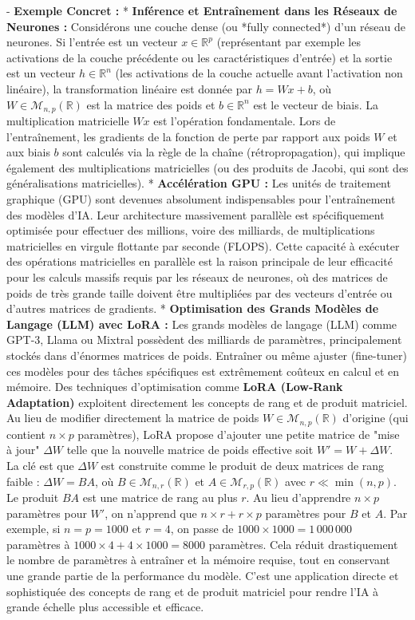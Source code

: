 \documentclass[12pt,a4paper]{report}
\begin{document}
-   \textbf{Exemple Concret :}
    *   \textbf{Inférence et Entraînement dans les Réseaux de Neurones :} Considérons une couche dense (ou *fully connected*) d'un réseau de neurones. Si l'entrée est un vecteur $x \in \mathbb{R}^p$ (représentant par exemple les activations de la couche précédente ou les caractéristiques d'entrée) et la sortie est un vecteur $h \in \mathbb{R}^n$ (les activations de la couche actuelle avant l'activation non linéaire), la transformation linéaire est donnée par $h = Wx + b$, où $W \in \mathcal{M}_{n,p}(\mathbb{R})$ est la matrice des poids et $b \in \mathbb{R}^n$ est le vecteur de biais. La multiplication matricielle $Wx$ est l'opération fondamentale. Lors de l'entraînement, les gradients de la fonction de perte par rapport aux poids $W$ et aux biais $b$ sont calculés via la règle de la chaîne (rétropropagation), qui implique également des multiplications matricielles (ou des produits de Jacobi, qui sont des généralisations matricielles).
    *   \textbf{Accélération GPU :} Les unités de traitement graphique (GPU) sont devenues absolument indispensables pour l'entraînement des modèles d'IA. Leur architecture massivement parallèle est spécifiquement optimisée pour effectuer des millions, voire des milliards, de multiplications matricielles en virgule flottante par seconde (FLOPS). Cette capacité à exécuter des opérations matricielles en parallèle est la raison principale de leur efficacité pour les calculs massifs requis par les réseaux de neurones, où des matrices de poids de très grande taille doivent être multipliées par des vecteurs d'entrée ou d'autres matrices de gradients.
    *   \textbf{Optimisation des Grands Modèles de Langage (LLM) avec LoRA :} Les grands modèles de langage (LLM) comme GPT-3, Llama ou Mixtral possèdent des milliards de paramètres, principalement stockés dans d'énormes matrices de poids. Entraîner ou même ajuster (fine-tuner) ces modèles pour des tâches spécifiques est extrêmement coûteux en calcul et en mémoire. Des techniques d'optimisation comme \textbf{LoRA (Low-Rank Adaptation)} exploitent directement les concepts de rang et de produit matriciel. Au lieu de modifier directement la matrice de poids $W \in \mathcal{M}_{n,p}(\mathbb{R})$ d'origine (qui contient $n \times p$ paramètres), LoRA propose d'ajouter une petite matrice de "mise à jour" $\Delta W$ telle que la nouvelle matrice de poids effective soit $W' = W + \Delta W$. La clé est que $\Delta W$ est construite comme le produit de deux matrices de rang faible : $\Delta W = BA$, où $B \in \mathcal{M}_{n,r}(\mathbb{R})$ et $A \in \mathcal{M}_{r,p}(\mathbb{R})$ avec $r \ll \min(n,p)$. Le produit $BA$ est une matrice de rang au plus $r$. Au lieu d'apprendre $n \times p$ paramètres pour $W'$, on n'apprend que $n \times r + r \times p$ paramètres pour $B$ et $A$. Par exemple, si $n=p=1000$ et $r=4$, on passe de $1000 \times 1000 = 1\,000\,000$ paramètres à $1000 \times 4 + 4 \times 1000 = 8000$ paramètres. Cela réduit drastiquement le nombre de paramètres à entraîner et la mémoire requise, tout en conservant une grande partie de la performance du modèle. C'est une application directe et sophistiquée des concepts de rang et de produit matriciel pour rendre l'IA à grande échelle plus accessible et efficace.
\end{document}
